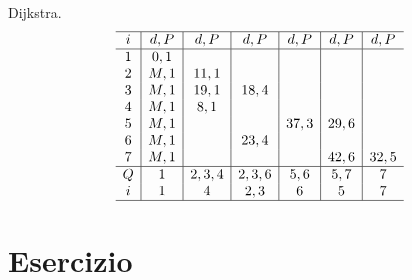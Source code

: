 \documentclass[10pt,a4paper,twoside,openright]{book}
\newcounter{es}
\newcommand{\Es}{
	\stepcounter{es}
	\section{Esercizio \arabic{es}}
	}
\numberwithin{es}{chapter}
\begin{document}
Dijkstra.
\begin{equation*}
\begin{array}{ c|c|c|c|c|c|c }
\hline
i & d,P & d,P & d,P & d,P & d,P & d,P\\
\hline
1 & 0,1 &  &  &  &  & \\
2 & M,1 & 11,1 &  &  &  & \\
3 & M,1 & 19,1 & 18,4 &  &  & \\
4 & M,1 & 8,1 &  &  &  & \\
5 & M,1 &  &  & 37,3 & 29,6 & \\
6 & M,1 &  & 23,4 &  &  & \\
7 & M,1 &  &  &  & 42,6 & 32,5\\
\hline
Q & 1 & 2,3,4 & 2,3,6 & 5,6 & 5,7 & 7\\
i & 1 & 4 & 2,3 & 6 & 5 & 7\\
\hline
\end{array}
\end{equation*}

\newpage

\Es
\end{document}
